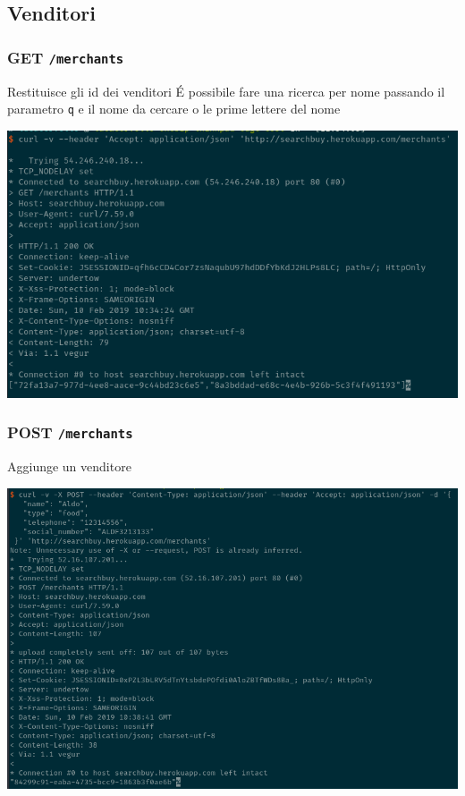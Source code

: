 \documentclass[11pt]{article}
\begin{document}
\subsection{Venditori}
\label{sec:org77c0a9e}
\subsubsection{GET \texttt{/merchants}}
\label{sec:org7b12301}
Restituisce gli id dei venditori
É possibile fare una ricerca per nome passando il parametro \texttt{q} e il nome da cercare o le prime lettere del nome
\begin{center}
\includegraphics[width=.9\linewidth]{img/merchants-screen/get-merchants.png}
\end{center}
\subsubsection{POST \texttt{/merchants}}
\label{sec:orgd6c9cbd}
Aggiunge un venditore
\begin{center}
\includegraphics[width=.9\linewidth]{img/merchants-screen/post-merchants.png}
\end{center}
\end{document}
